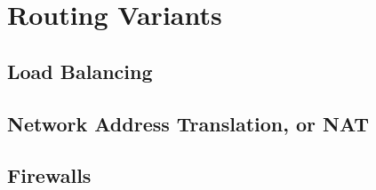 \chapter{Routing Variants}

\section{Load Balancing}

\section{Network Address Translation, or NAT}

\section{Firewalls}

